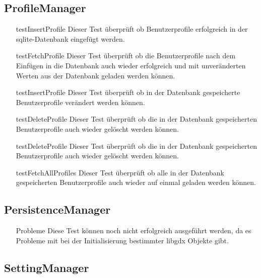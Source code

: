 \subsection{ProfileManager}

\begin{itemize}

\item[testInsertProfile]
Dieser Test überprüft ob Benutzerprofile erfolgreich in der sqlite-Datenbank eingefügt werden. 

\item[testFetchProfile]
Dieser Test überprüft ob die Benutzerprofile nach dem Einfügen in die Datenbank auch wieder erfolgreich und mit unveränderten Werten aus der Datenbank geladen werden können.

\item[testInsertProfile]
Dieser Test überprüft ob in der Datenbank gespeicherte Benutzerprofile verändert werden können.

\item[testDeleteProfile]
Dieser Test überprüft ob die in der Datenbank gespeicherten Benutzerprofile auch wieder gelöscht werden können.

\item[testDeleteProfile]
Dieser Test überprüft ob die in der Datenbank gespeicherten Benutzerprofile auch wieder gelöscht werden können.

\item[testFetchAllProfiles]
Dieser Test überprüft ob alle in der Datenbank gespeicherten Benutzerprofile auch wieder auf einmal geladen werden können.

\end{itemize}


\subsection{PersistenceManager}

\begin{itemize}

\item[Probleme]
Diese Test können noch nicht erfolgreich ausgeführt werden, da es Probleme mit bei der Initialisierung bestimmter libgdx Objekte gibt.

\end{itemize}

\subsection{SettingManager}

